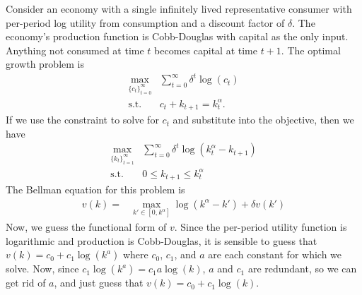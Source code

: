 \begin{example}
  Consider an economy with a single infinitely lived representative
  consumer with per-period log utility from consumption and a discount
  factor of $\delta$. The economy's production function is
  Cobb-Douglas with capital as the only input. Anything not consumed
  at time $t$ becomes capital at time $t+1$. The optimal growth
  problem is
  \begin{align*}
    \max_{\{c_t\}_{t=0}^\infty} & \sum_{t=0}^\infty \delta^t
    \log(c_t) \\
    \text{s.t. } & c_t + k_{t+1} = k_t^\alpha.
  \end{align*}
  If we use the constraint to solve for $c_t$ and substitute into the
  objective, then we have
  \begin{align*}
    \max_{\{k_t\}_{t=1}^\infty} & \sum_{t=0}^\infty \delta^t
    \log(k_t^\alpha - k_{t+1}) \\
    \text{s.t.} & 0 \leq k_{t+1} \leq k_t^\alpha 
  \end{align*}
 The Bellman equation for this problem is
 \begin{align*}
   v(k) = & \max_{k' \in [0,k^\alpha]} \log(k^\alpha - k') + \delta
   v(k')
 \end{align*}
 Now, we guess the functional form of $v$. Since the per-period
 utility function is logarithmic and production is Cobb-Douglas, it is
 sensible to guess that $v(k) = c_0 + c_1 \log(k^a)$ where $c_0$,
 $c_1$, and $a$ are each constant for which we solve. Now, since $c_1
 \log(k^a) = c_1 a \log(k)$, $a$ and $c_1$ are redundant, so we can
 get rid of $a$, and just guess that $v(k) = c_0 + c_1 \log(k)$. 
 

\end{example}
